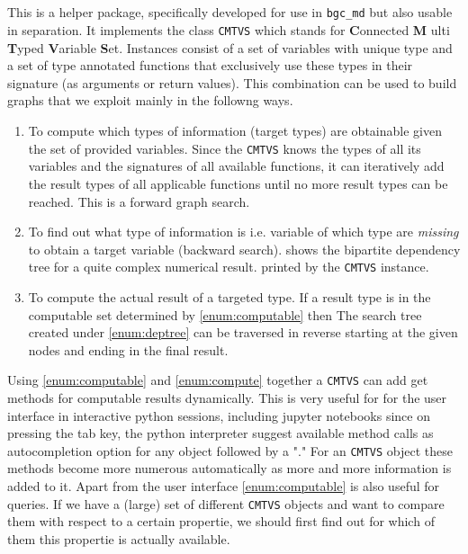 \subsection{\ComputabilityGraphs}
This is a helper package, specifically developed for use in \texttt{bgc\_md} but also usable in separation.
It implements the class \texttt{CMTVS} which stands for 
{\bf C}onnected {\bf M} ulti {\bf T}yped {\bf V}ariable {\bf S}et. 
Instances consist of a set of variables with unique type and a set of type annotated functions that exclusively 
use these types in their signature (as arguments or return values). 
This combination can be used to build graphs that we exploit mainly in the followng ways.
\begin{enumerate}
  \item
  \label{enum:computable}
  To compute which types of information (target types) are obtainable given the set
  of provided variables. 
  Since the \texttt{CMTVS} knows the types of all its variables and the signatures of all
  available functions, it can iteratively add the result types of all applicable functions until no
  more result types can be reached. This is a forward graph search.
  \item
  \label{enum:deptree}
  To find out what type of information is i.e. variable of which type are 
  \emph{missing} to obtain a 
  target variable (backward search).  
   shows the bipartite dependency tree for a quite complex numerical result.
  printed by the \texttt{CMTVS} instance. 
  \item
  \label{enum:compute}
  To compute the actual result of a targeted type.
  If a result type is in the computable set determined by \ref{enum:computable} then 
  The search tree created under \ref{enum:deptree} can be traversed in reverse starting
  at the given nodes and ending in the final result.
\end{enumerate}
Using \ref{enum:computable} and \ref{enum:compute} together a \texttt{CMTVS} can add 
get methods for computable results dynamically. 
This is very useful for for the user interface in interactive python sessions, including jupyter notebooks
since on pressing the tab key, the python interpreter suggest available method calls
as autocompletion option for any object followed by a "." 
For an \texttt{CMTVS} object these methods become more numerous automatically as more and
more information is added to it.
Apart from the user interface \ref{enum:computable} is also useful for queries. 
If we have a (large) set of different \texttt{CMTVS} objects and want to compare them with respect
to a certain propertie, we should first find out for which of them this propertie is actually 
available.

